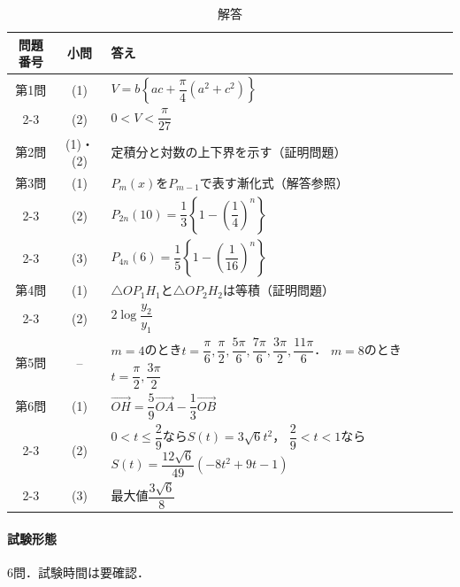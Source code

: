 \documentclass[../../main.tex]{subfiles}
\begin{document}
\begin{table}[htb]
  \centering
  \caption{解答}
  \renewcommand{\arraystretch}{1.4}
  \begin{tabular}{|c|c|p{9cm}|}
    \hline
    \textbf{問題番号} & \textbf{小問} & \textbf{答え} \\
    \hline
    第1問 & (1) & $V=b\left\{ac+\dfrac{\pi}{4}(a^2+c^2)\right\}$ \\
    \cline{2-3}
    & (2) & $0<V<\dfrac{\pi}{27}$ \\
    \hline
    第2問 & (1)・(2) & 定積分と対数の上下界を示す（証明問題） \\
    \hline
    第3問 & (1) & $P_m(x)$を$P_{m-1}$で表す漸化式（解答参照） \\
    \cline{2-3}
    & (2) & $P_{2n}(10)=\dfrac{1}{3}\left\{1-\left(\dfrac{1}{4}\right)^n\right\}$ \\
    \cline{2-3}
    & (3) & $P_{4n}(6)=\dfrac{1}{5}\left\{1-\left(\dfrac{1}{16}\right)^n\right\}$ \\
    \hline
    第4問 & (1) & $\triangle OP_1H_1$と$\triangle OP_2H_2$は等積（証明問題） \\
    \cline{2-3}
    & (2) & $2\log\dfrac{y_2}{y_1}$ \\
    \hline
    第5問 & -- & $m=4$のとき$t=\dfrac{\pi}{6},\dfrac{\pi}{2},
    \dfrac{5\pi}{6},\dfrac{7\pi}{6},\dfrac{3\pi}{2},\dfrac{11\pi}{6}$．
    $m=8$のとき$t=\dfrac{\pi}{2},\dfrac{3\pi}{2}$ \\
    \hline
    第6問 & (1) & $\overrightarrow{OH}=\dfrac{5}{9}\overrightarrow{OA}
    -\dfrac{1}{3}\overrightarrow{OB}$ \\
    \cline{2-3}
    & (2) & $0<t\le\dfrac{2}{9}$なら$S(t)=3\sqrt{6}t^2$，
    $\dfrac{2}{9}<t<1$なら
    $S(t)=\dfrac{12\sqrt{6}}{49}(-8t^2+9t-1)$ \\
    \cline{2-3}
    & (3) & 最大値$\dfrac{3\sqrt{6}}{8}$ \\
    \hline
  \end{tabular}
\end{table}

\paragraph{試験形態}
6問．試験時間は要確認．
\end{document}

